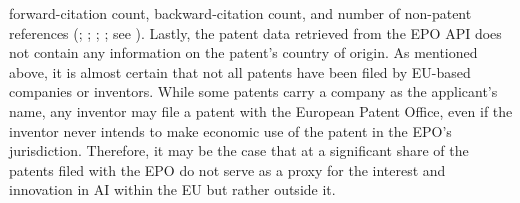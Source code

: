 \documentclass[
  12pt,
  a4paperpaper,
]{article}
\begin{document}
forward-citation count, backward-citation count, and number of
non-patent references (; ; ; ;
see ). Lastly, the patent data retrieved from the EPO API does not
contain any information on the patent's country of origin. As mentioned
above, it is almost certain that not all patents have been filed by
EU-based companies or inventors. While some patents carry a company as
the applicant's name, any inventor may file a patent with the European
Patent Office, even if the inventor never intends to make economic use
of the patent in the EPO's jurisdiction. Therefore, it may be the case
that at a significant share of the patents filed with the EPO do not
serve as a proxy for the interest and innovation in AI within the EU but
rather outside it.
\end{document}
